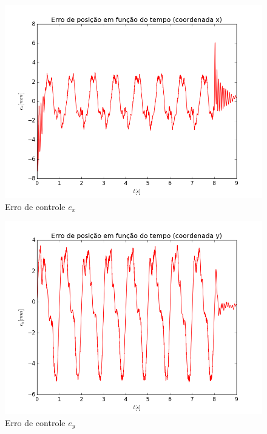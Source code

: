 \documentclass[]{politex}
\begin{document}
\begin{multicols}{2}
\begin{figure}[H]
	\centering
	\includegraphics[scale=0.39]{../../../Experimental/Aquisicoes/PIDt_circulo/ex.png}  
	\caption{Erro de controle $e_x$}
	\label{fig:PIDq_circulo_ex}
\end{figure}
\begin{figure}[H]
	\centering
	\includegraphics[scale=0.39]{../../../Experimental/Aquisicoes/PIDt_circulo/ey.png}  
	\caption{Erro de controle $e_y$}
	\label{fig:PIDq_circulo_ey}
\end{figure}
\end{multicols}
\end{document}
